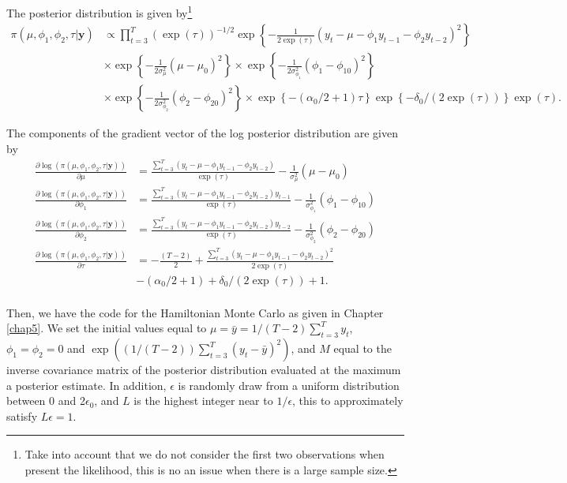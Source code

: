 The posterior distribution is given by\footnote{Take into account that we do not consider the first two observations when present the likelihood, this is no an issue when there is a large sample size.}
\begin{align*}
	\pi(\mu,\phi_1,\phi_2,\tau|\bm{y})&\propto \prod_{t=3}^T(\exp(\tau))^{-1/2}\exp\left\{-\frac{1}{2\exp(\tau)}(y_t-\mu-\phi_1y_{t-1}-\phi_2y_{t-2})^2\right\}\\
	&\times\exp\left\{-\frac{1}{2\sigma^2_{\mu}}(\mu-\mu_0)^2\right\}\times\exp\left\{-\frac{1}{2\sigma^2_{\phi_1}}(\phi_1-\phi_{10})^2\right\}\\
	&\times\exp\left\{-\frac{1}{2\sigma^2_{\phi_2}}(\phi_2-\phi_{20})^2\right\}\times\exp\left\{-(\alpha_0/2+1)\tau\right\}\exp\left\{-\delta_0/(2\exp(\tau))\right\}\exp(\tau).
\end{align*} 

The components of the gradient vector of the log posterior distribution are given by
\begin{align*}
	\frac{\partial \log(\pi(\mu,\phi_1,\phi_2,\tau|\bm{y}))}{\partial\mu}&=\frac{\sum_{t=3}^T(y_t-\mu-\phi_1y_{t-1}-\phi_2y_{t-2})}{\exp(\tau)}-\frac{1}{\sigma_{\mu}^2}(\mu-\mu_0)\\
	\frac{\partial\log(\pi(\mu,\phi_1,\phi_2,\tau|\bm{y}))}{\partial\phi_1}&=\frac{\sum_{t=3}^T(y_t-\mu-\phi_1y_{t-1}-\phi_2y_{t-2})y_{t-1}}{\exp(\tau)}-\frac{1}{\sigma_{\phi_1}^2}(\phi_1-\phi_{10})\\
	\frac{\partial\log(\pi(\mu,\phi_1,\phi_2,\tau|\bm{y}))}{\partial\phi_2}&=\frac{\sum_{t=3}^T(y_t-\mu-\phi_1y_{t-1}-\phi_2y_{t-2})y_{t-2}}{\exp(\tau)}-\frac{1}{\sigma_{\phi_2}^2}(\phi_2-\phi_{20})\\	\frac{\partial\log(\pi(\mu,\phi_1,\phi_2,\tau|\bm{y}))}{\partial\tau}&=-\frac{(T-2)}{2}+\frac{\sum_{t=3}^T(y_t-\mu-\phi_1y_{t-1}-\phi_2y_{t-2})^2}{2\exp(\tau)}\\
	&-(\alpha_0/2+1)+\delta_0/(2\exp(\tau))+1.\\
\end{align*}

Then, we have the code for the Hamiltonian Monte Carlo as given in Chapter \ref{chap5}. We set the initial values equal to $\mu=\bar{y}=1/(T-2)\sum_{t=3}^T y_t$, $\phi_1=\phi_2=0$ and $\exp((1/(T-2))\sum_{t=3}^T(y_t-\bar{y})^2)$, and $M$ equal to the inverse covariance matrix of the posterior distribution evaluated at the maximum a posterior estimate. In addition, $\epsilon$ is randomly draw from a uniform distribution between 0 and 2$\epsilon_0$, and $L$ is the highest integer near to $1/\epsilon$, this to approximately satisfy $L\epsilon=1$. 

